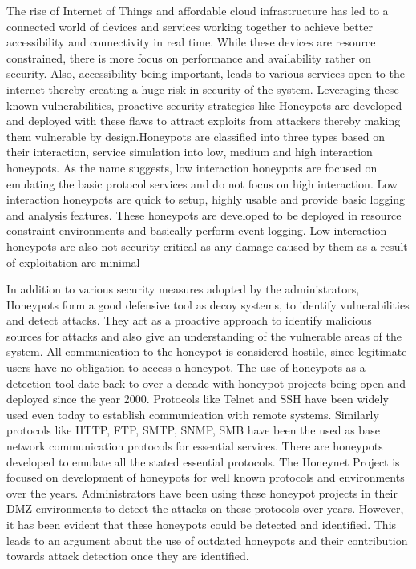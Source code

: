 \documentclass[letterpaper, 10 pt, conference]{ieeeconf}  %
\begin{document}
The rise of Internet of Things and affordable cloud infrastructure has led to a connected world of devices and services working together to achieve better accessibility and connectivity in real time. While these devices are resource constrained, there is more focus on performance and availability rather on security. Also, accessibility being important, leads to various services open to the internet thereby creating a huge risk in security of the system. Leveraging these known vulnerabilities, proactive security strategies like Honeypots are developed and deployed with these flaws to attract exploits from attackers thereby making them vulnerable by design.Honeypots are classified into three types based on their interaction, service simulation into low, medium and high interaction honeypots. As the name suggests, low interaction honeypots are focused on emulating the basic protocol services and do not focus on high interaction. Low interaction honeypots are quick to setup, highly usable and provide basic logging and analysis features. These honeypots are developed  to be deployed in resource constraint environments and basically perform event logging. Low interaction honeypots are also not security critical as any damage caused by them as a result of exploitation are minimal 

In addition to various security measures adopted by the administrators, Honeypots form a good defensive tool as decoy systems, to identify vulnerabilities and detect attacks. They act as a proactive approach to identify malicious sources for attacks and also give an understanding of the vulnerable areas of the system. All communication to the honeypot is considered hostile, since legitimate users have no obligation to access a honeypot. The use of honeypots as a detection tool date back to over a decade with honeypot projects being open and deployed since the year 2000. Protocols like Telnet and SSH have been widely used even today to establish communication with remote systems. Similarly protocols like HTTP, FTP, SMTP, SNMP, SMB have been the used as base network communication protocols for essential services. There are honeypots developed to emulate all the stated essential protocols. The Honeynet Project \cite{Honeynet} is focused on development of honeypots for well known protocols and environments over the years. Administrators have been using these honeypot projects in their DMZ environments to detect the attacks on these protocols over years. However, it has been evident that these honeypots could be detected and identified. This leads to an argument about the use of outdated honeypots \cite{counting} and their contribution towards attack detection once they are identified.
\end{document}
